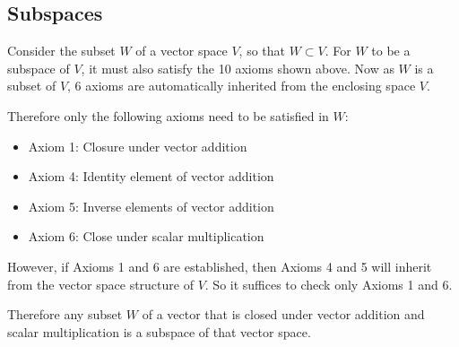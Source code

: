 \documentclass{article}
\begin{document}
\begin{multicols*}{3}
    \subsection{Subspaces}
    Consider the subset \(W\) of a vector space \(V\), so that \(W \subset V\).
    For \(W\) to be a subspace of \(V\), it must also satisfy the 10 axioms shown above.
    Now as \(W\) is a subset of \(V\), 6 axioms are automatically inherited from the enclosing space \(V\).

    Therefore only the following axioms need to be satisfied in \(W\):
    \begin{itemize}
        \item Axiom 1: Closure under vector addition
        \item Axiom 4: Identity element of vector addition
        \item Axiom 5: Inverse elements of vector addition
        \item Axiom 6: Close under scalar multiplication
    \end{itemize}
    However, if Axioms 1 and 6 are established, then Axioms 4 and 5 will inherit from
    the vector space structure of \(V\). So it suffices to check only Axioms 1 and 6.

    Therefore any subset \(W\) of a vector that is closed under vector addition and scalar multiplication is a subspace
    of that vector space.

\end{multicols*}
\end{document}
